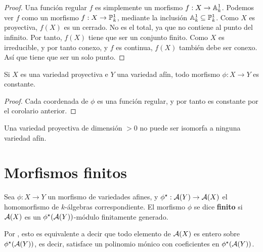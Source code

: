 \documentclass[ACGA.tex]{subfiles}
\begin{document}
\begin{proof}
 Una función regular $f$ es simplemente un morfismo $f:X\to\mathbb{A}^1_k$. Podemos ver $f$ como un morfismo $f:X\to\mathbb{P}^1_k$, mediante la inclusión $\mathbb{A}^1_k\subseteq\mathbb{P}^1_k$. Como $X$ es proyectiva, $f(X)$ es un cerrado. No es el total, ya que no contiene al punto del infinito. Por tanto, $f(X)$ tiene que ser un conjunto finito. Como $X$ es irreducible, y por tanto conexo, y $f$ es continua, $f(X)$ también debe ser conexo. Así que tiene que ser un solo punto.
\end{proof}

\begin{coro}
 Si $X$ es una variedad proyectiva e $Y$ una variedad afín, todo morfismo $\phi:X\to Y$ es constante.
\end{coro}

\begin{proof}
 Cada coordenada de $\phi$ es una función regular, y por tanto es constante por el corolario anterior.
\end{proof}

\begin{coro}\label{proyectivanoafin}
 Una variedad proyectiva de dimensión $>0$ no puede ser isomorfa a ninguna variedad afín.
\end{coro}

\section{Morfismos finitos}

\begin{defi}
 Sea $\phi:X\to Y$ un morfismo de variedades afines, y $\phi^\star:\mathcal{A}(Y)\to\mathcal{A}(X)$ el homomorfismo de $k$-álgebras correspondiente. El morfismo $\phi$ se dice {\bf finito} si $\mathcal{A}(X)$ es un $\phi^\star(\mathcal{A}(Y))$-módulo finitamente generado.
\end{defi}

Por \cite[Proposición 5.1]{am}, esto es equivalente a decir que todo elemento de $\mathcal{A}(X)$ es entero sobre $\phi^\star(\mathcal{A}(Y))$, es decir, satisface un polinomio mónico con coeficientes en $\phi^\star(\mathcal{A}(Y))$.
\end{document}
